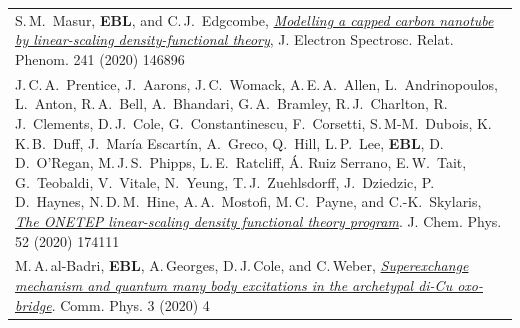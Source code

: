 \documentclass[10pt,a4paper,final]{article}
\begin{document}
\begin{tabularx}{\textwidth}{
   X}
   S.\,M.\ Masur, \textbf{EBL}, and C.\,J.\ Edgcombe, \href{https://www.sciencedirect.com/science/article/pii/S036820481930221X}{\textit{Modelling a capped carbon nanotube by linear-scaling density-functional theory}}, J. Electron Spectrosc. Relat. Phenom. 241 (2020) 146896                                                                                                                                                                                                                                                                                                                                                                                                                                                                                     \\ %
   J.\,C.\,A.\ Prentice, J.\ Aarons, J.\,C.\ Womack, A.\,E.\,A.\ Allen, L.\ Andrinopoulos, L.\ Anton, R.\,A.\ Bell, A.\ Bhandari, G.\,A.\ Bramley, R.\,J.\ Charlton, R.\,J.\ Clements, D.\,J.\ Cole, G.\ Constantinescu, F.\ Corsetti, S.\,M-M.\ Dubois, K.\,K.\,B.\ Duff, J.\ María Escartín, A.\ Greco, Q.\ Hill, L.\,P.\ Lee, \textbf{EBL}, D.\,D.\ O’Regan, M.\,J.\,S.\ Phipps, L.\,E.\ Ratcliff, Á. Ruiz Serrano, E.\,W.\ Tait, G.\ Teobaldi, V.\ Vitale, N.\ Yeung, T.\,J.\ Zuehlsdorff, J.\ Dziedzic, P.\,D.\ Haynes, N.\,D.\,M.\ Hine, A.\,A.\ Mostofi, M.\,C.\ Payne, and C.-K.\ Skylaris, \href{https://aip.scitation.org/doi/full/10.1063/5.0004445}{\textit{The ONETEP linear-scaling density functional theory program}}. J. Chem. Phys. 52 (2020) 174111 \\ %
   M.\,A.\,al-Badri, \textbf{EBL}, A.\,Georges, D.\,J.\,Cole, and C.\,Weber, \href{https://www.nature.com/articles/s42005-019-0270-1}{\textit{Superexchange mechanism and quantum many body excitations in the archetypal di-Cu oxo-bridge}}. Comm. Phys. 3 (2020) 4                                                                                                                                                                                                                                                                                                                                                                                                                                                                                                   \\ %

\end{tabularx}
\end{document}
